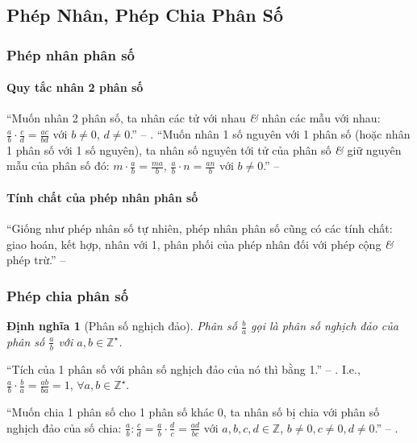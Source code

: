 \documentclass{article}
\numberwithin{equation}{section}
\newtheorem{dinhnghia}{Định nghĩa}[section]
\begin{document}
\subsection{Phép Nhân, Phép Chia Phân Số}

\subsubsection{Phép nhân phân số}

\paragraph{Quy tắc nhân 2 phân số}
``Muốn nhân 2 phân số, ta nhân các tử với nhau \textit{\&} nhân các mẫu với nhau: $\frac{a}{b}\cdot\frac{c}{d} = \frac{ac}{bd}$ với $b\ne 0$, $d\ne 0$.'' -- \cite[p. 40]{SGK_Toan_6_Canh_Dieu_tap_2}. ``Muốn nhân 1 số nguyên với 1 phân số (hoặc nhân 1 phân số với 1 số nguyên), ta nhân số nguyên tới tử của phân số \textit{\&} giữ nguyên mẫu của phân số đó: $m\cdot\frac{a}{b} = \frac{ma}{b}$, $\frac{a}{b}\cdot n = \frac{an}{b}$ với $b\ne 0$.'' -- \cite[p. 41]{SGK_Toan_6_Canh_Dieu_tap_2}

\paragraph{Tính chất của phép nhân phân số}
``Giống như phép nhân số tự nhiên, phép nhân phân số cũng có các tính chất: giao hoán, kết hợp, nhân với 1, phân phối của phép nhân đối với phép cộng \textit{\&} phép trừ.'' -- \cite[p. 41]{SGK_Toan_6_Canh_Dieu_tap_2}

\subsubsection{Phép chia phân số}
 
\begin{dinhnghia}[Phân số nghịch đảo]
	Phân số $\frac{b}{a}$ gọi là \emph{phân số nghịch đảo} của phân số $\frac{a}{b}$ với $a,b\in\mathbb{Z}^\star$.
\end{dinhnghia}
``Tích của 1 phân số với phân số nghịch đảo của nó thì bằng 1.'' -- \cite[p. 42]{SGK_Toan_6_Canh_Dieu_tap_2}. I.e., $\frac{a}{b}\cdot\frac{b}{a} = \frac{ab}{ba} = 1$, $\forall a,b\in\mathbb{Z}^\star$.

``Muốn chia 1 phân số cho 1 phân số khác 0, ta nhân số bị chia với phân số nghịch đảo của số chia: $\frac{a}{b}:\frac{c}{d} = \frac{a}{b}\cdot\frac{d}{c} = \frac{ad}{bc}$ với $a,b,c,d\in\mathbb{Z}$, $b\ne 0,c\ne 0,d\ne 0$.'' -- \cite[p. 42]{SGK_Toan_6_Canh_Dieu_tap_2}.
\end{document}
